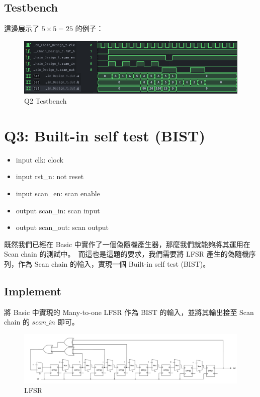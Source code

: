 \documentclass[10.5pt,compsoc,UTF8]{CjC}
\theoremstyle{mystyle}
\begin{document}
\subsection{Testbench}
這邊展示了 $5 \times 5 = 25$ 的例子：

\begin{figure}[h!]
  \centering
  \includegraphics[width=\textwidth]{./img/Q2-tb.png}
  \caption{Q2 Testbench}
  \label{fig:Q2-Testbench}
\end{figure}


\section{Q3: Built-in self test (BIST)}
\begin{itemize}
  \item input clk: clock
  \item input rst\_n: not reset
  \item input scan\_en: scan enable
  \item output scan\_in: scan input
  \item output scan\_out: scan output
\end{itemize}

既然我們已經在 Basic 中實作了一個偽隨機產生器，那麼我們就能夠將其運用在 Scan chain 的測試中。\
而這也是這題的要求，我們需要將 LFSR 產生的偽隨機序列，作為 Scan chain 的輸入，實現一個 Built-in self test (BIST)。
\newpage
\subsection{Implement}
將 Basic 中實現的 Many-to-one LFSR 作為 BIST 的輸入，並將其輸出接至 Scan chain 的 $scan\_in$ 即可。

\begin{figure}[h!]
  \centering
  \includegraphics[width=\textwidth]{./img/Q3-LFSR.png}
  \caption{LFSR}
  \label{fig:LFSR}
\end{figure}
\end{document}
